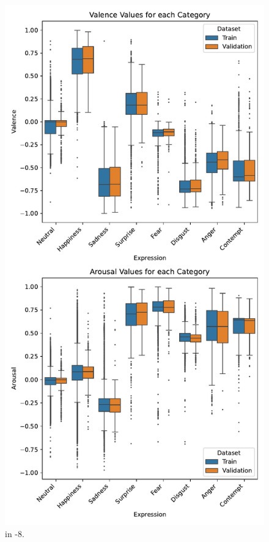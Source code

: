 \begin{figure}[t]
    \centering
    \includegraphics[width=0.65\columnwidth]{pictures/affectnet/av_for_each_category.pdf}
    \caption{\VA{} in \affectnet{}-8.}
    \label{fig:affectnet_av_for_each_category}
\end{figure}


